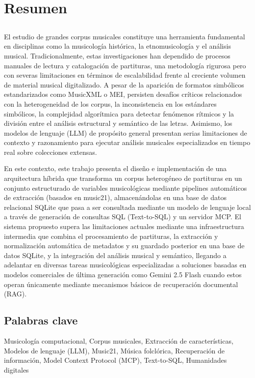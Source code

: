 \chapter*{Resumen}

\section*{\tituloPortadaVal}

El estudio de grandes corpus musicales constituye una herramienta fundamental en disciplinas como la musicología histórica, la etnomusicología y el análisis musical. Tradicionalmente, estas investigaciones han dependido de procesos manuales de lectura y catalogación de partituras, una metodología rigurosa pero con severas limitaciones en términos de escalabilidad frente al creciente volumen de material musical digitalizado. A pesar de la aparición de formatos simbólicos estandarizados como MusicXML o MEI, persisten desafíos críticos relacionados con la heterogeneidad de los corpus, la inconsistencia en los estándares simbólicos, la complejidad algorítmica para detectar fenómenos rítmicos y la división entre el análisis estructural y semántico de las letras. Asimismo, los modelos de lenguaje (LLM) de propósito general presentan serias limitaciones de contexto y razonamiento para ejecutar análisis musicales especializados en tiempo real sobre colecciones extensas.

En este contexto, este trabajo presenta el diseño e implementación de una arquitectura híbrida que transforma un corpus heterogéneo de partituras en un conjunto estructurado de variables musicológicas mediante pipelines automáticos de extracción (basados en music21), almacenándolas en una base de datos relacional SQLite que pasa a ser consultada mediante un modelo de lenguaje local a través de generación de consultas SQL (Text-to-SQL) y un servidor MCP. El sistema propuesto supera las limitaciones actuales mediante una infraestructura intermedia que combina el procesamiento de partituras, la extracción y normalización automática de metadatos y su guardado posterior en una base de datos SQLite, y la integración del análisis musical y semántico, llegando a adelantar en diversas tareas musicológicas especializadas a soluciones basadas en modelos comerciales de última generación como Gemini 2.5 Flash cuando estos operan únicamente mediante mecanismos básicos de recuperación documental (RAG).

\section*{Palabras clave}
   
\noindent Musicología computacional, Corpus musicales, Extracción de características, Modelos de lenguaje (LLM), Music21, Música folclórica, Recuperación de información, Model Context Protocol (MCP), Text-to-SQL, Humanidades digitales